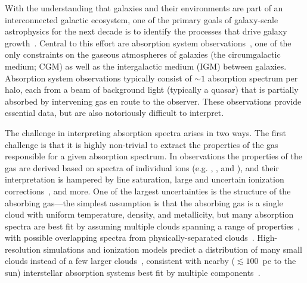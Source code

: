 \documentclass[fleqn,usenatbib]{mnras}
\begin{document}
With the understanding that galaxies and their environments are part of an interconnected galactic ecosystem, one of the primary goals of galaxy-scale astrophysics for the next decade is to identify the processes that drive galaxy growth~\citep{Decadal2020}.
Central to this effort are absorption system observations~\citep[e.g.][]{bahcall1993Hubble, lanzetta1995Gaseous, lauroesch1996QSO, Charlton1996,churchill1996Spatial,Prochaska1997,Rauch1997,Tumlinson2013,Werk2014,Prochaska2017,Kacprzak2019,Lehner2020}, one of the only constraints on the gaseous atmospheres of galaxies (the circumgalactic medium; CGM) as well as the intergalactic medium (IGM) between galaxies.
Absorption system observations typically consist of $\sim 1$ absorption spectrum per halo, each from a beam of background light (typically a quasar) that is partially absorbed by intervening gas en route to the observer.
These observations provide essential data, but are also notoriously difficult to interpret.

The challenge in interpreting absorption spectra arises in two ways.
The first challenge is that it is highly non-trivial to extract the properties of the gas responsible for a given absorption spectrum.
In observations the properties of the gas are derived based on spectra of individual ions (e.g. , , and ), and their interpretation is hampered by line saturation, large and uncertain ionization corrections~\citep[e.g.][]{schaye2006Importance, acharya2021How}, and more.
One of the largest uncertainties is the structure of the absorbing gas---the simplest assumption is that the absorbing gas is a single cloud with uniform temperature, density, and metallicity, but many absorption spectra are best fit by assuming multiple clouds spanning a range of properties~\citep[e.g.][]{boksenberg1979Multiple, muzahid2015Extreme, liang2017BayesVP, Lehner2019,Wotta2019, haislmaier2021COS, sameer2021Cloudbycloud, zahedy2021.CUBS.III.zle1.LLSs, marra2021.cosmo.sims.test.observational.modeling, narayanan2021.a.multiphase.pLLS, nielsen2022Complex}, with possible overlapping spectra from physically-separated clouds~\citep[e.g.][]{marra2022Examining}.
High-resolution simulations and ionization models predict a distribution of many small clouds instead of a few larger clouds~\citep[e.g.][]{fielding2020Multiphase, lehner2019COS},
consistent with nearby ($\lesssim 100$~pc to the sun) interstellar absorption systems best fit by multiple components~\citep[e.g.][]{welsh2010HighResolution}.
\end{document}
